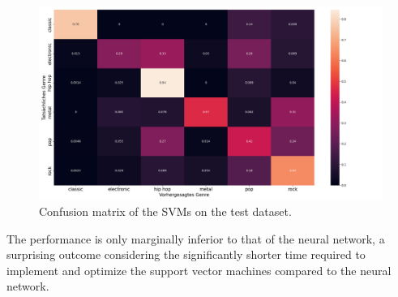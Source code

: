 \documentclass[
  12pt,
  bibliography=totoc,     %
  captions=tableheading,  %
  titlepage=firstiscover, %
]{scrartcl}
\begin{document}
\begin{figure}[H]
  \centering
  \includegraphics[scale=0.33]{figures/svm/confusion_matrix_svm.png}
  \caption{Confusion matrix of the SVMs on the test dataset.}
  \label{fig:conf_svm}
\end{figure}
\noindent
The performance is only marginally inferior to that of the neural network, a surprising outcome considering the significantly shorter time required to implement and optimize
the support vector machines compared to the neural network.
\end{document}
